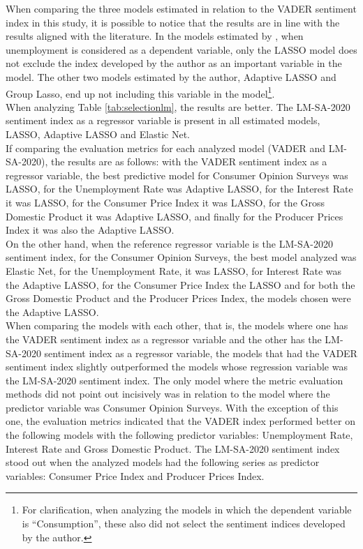 When comparing the three models estimated in relation to the VADER sentiment index in this study, it is possible to notice that the results are in line with the results aligned with the literature. In the models estimated by \cite{shapiro2020measuring}, when unemployment is considered as a dependent variable, only the LASSO model does not exclude the index developed by the author as an important variable in the model. The other two models estimated by the author, Adaptive LASSO and Group Lasso, end up not including this variable in the model\footnote{For clarification, when analyzing the models in which the dependent variable is ``Consumption'', these also did not select the sentiment indices developed by the author.}.\\

When analyzing Table \ref{tab:selectionlm}, the results are better. The LM-SA-2020 sentiment index as a regressor variable is present in all estimated models, LASSO, Adaptive LASSO and Elastic Net.\\

If comparing the evaluation metrics for each analyzed model (VADER and LM-SA-2020), the results are as follows: with the VADER sentiment index as a regressor variable, the best predictive model for Consumer Opinion Surveys was LASSO, for the Unemployment Rate was Adaptive LASSO, for the Interest Rate it was LASSO, for the Consumer Price Index it was LASSO, for the Gross Domestic Product it was Adaptive LASSO, and finally for the Producer Prices Index it was also the Adaptive LASSO.\\

On the other hand, when the reference regressor variable is the LM-SA-2020 sentiment index, for the Consumer Opinion Surveys, the best model analyzed was Elastic Net, for the Unemployment Rate, it was LASSO, for Interest Rate was the Adaptive LASSO, for the Consumer Price Index the LASSO and for both the Gross Domestic Product and the Producer Prices Index, the models chosen were the Adaptive LASSO.\\

When comparing the models with each other, that is, the models where one has the VADER sentiment index as a regressor variable and the other has the LM-SA-2020 sentiment index as a regressor variable, the models that had the VADER sentiment index slightly outperformed the models whose regression variable was the LM-SA-2020 sentiment index. The only model where the metric evaluation methods did not point out incisively was in relation to the model where the predictor variable was Consumer Opinion Surveys. With the exception of this one, the evaluation metrics indicated that the VADER index performed better on the following models with the following predictor variables: Unemployment Rate, Interest Rate and Gross Domestic Product. The LM-SA-2020 sentiment index stood out when the analyzed models had the following series as predictor variables: Consumer Price Index and Producer Prices Index.\\

